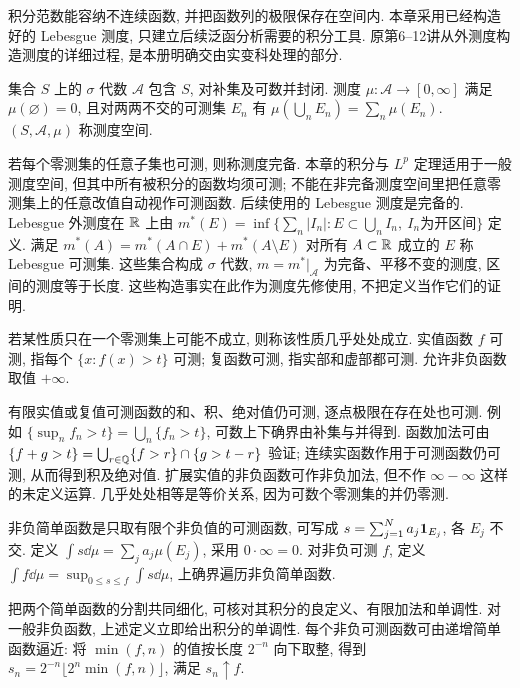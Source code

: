 \label{ch:measure}
积分范数能容纳不连续函数, 并把函数列的极限保存在空间内. 本章采用已经构造好的 Lebesgue 测度, 只建立后续泛函分析需要的积分工具. 原第6--12讲从外测度构造测度的详细过程, 是本册明确交由实变科处理的部分.

\begin{definition}
集合 $S$ 上的 $\sigma$ 代数 $\mathcal A$ 包含 $S$, 对补集及可数并封闭. 测度 $\mu:\mathcal A\to[0,\infty]$ 满足 $\mu(\varnothing)=0$, 且对两两不交的可测集 $E_n$ 有 $\mu(\bigcup_nE_n)=\sum_n\mu(E_n)$. $(S,\mathcal A,\mu)$ 称测度空间.
\end{definition}
若每个零测集的任意子集也可测, 则称测度完备. 本章的积分与 $L^p$ 定理适用于一般测度空间, 但其中所有被积分的函数均须可测; 不能在非完备测度空间里把任意零测集上的任意改值自动视作可测函数. 后续使用的 Lebesgue 测度是完备的.
Lebesgue 外测度在 $\mathbb R$ 上由
$m^*(E)=\inf\{\sum_n|I_n|:E\subset\bigcup_n I_n,\ I_n\text{为开区间}\}$ 定义. 满足 $m^*(A)=m^*(A\cap E)+m^*(A\setminus E)$ 对所有 $A\subset\mathbb R$ 成立的 $E$ 称 Lebesgue 可测集. 这些集合构成 $\sigma$ 代数, $m=m^*|_{\mathcal A}$ 为完备、平移不变的测度, 区间的测度等于长度. 这些构造事实在此作为测度先修使用, 不把定义当作它们的证明.

\begin{definition}
若某性质只在一个零测集上可能不成立, 则称该性质几乎处处成立. 实值函数 $f$ 可测, 指每个 $\{x:f(x)>t\}$ 可测; 复函数可测, 指实部和虚部都可测. 允许非负函数取值 $+\infty$.
\end{definition}
有限实值或复值可测函数的和、积、绝对值仍可测, 逐点极限在存在处也可测. 例如 $\{\sup_nf_n>t\}=\bigcup_n\{f_n>t\}$, 可数上下确界由补集与并得到. 函数加法可由 $\{f+g>t\}=\bigcup_{r\in\mathbb Q}\{f>r\}\cap\{g>t-r\}$ 验证; 连续实函数作用于可测函数仍可测, 从而得到积及绝对值. 扩展实值的非负函数可作非负加法, 但不作 $\infty-\infty$ 这样的未定义运算. 几乎处处相等是等价关系, 因为可数个零测集的并仍零测.

\begin{definition}
非负简单函数是只取有限个非负值的可测函数, 可写成 $s=\sum_{j=1}^Na_j\mathbf 1_{E_j}$, 各 $E_j$ 不交. 定义 $\int s\dd\mu=\sum_ja_j\mu(E_j)$, 采用 $0\cdot\infty=0$. 对非负可测 $f$, 定义 $\int f\dd\mu=\sup_{0\le s\le f}\int s\dd\mu$, 上确界遍历非负简单函数.
\end{definition}
把两个简单函数的分割共同细化, 可核对其积分的良定义、有限加法和单调性. 对一般非负函数, 上述定义立即给出积分的单调性. 每个非负可测函数可由递增简单函数逼近: 将 $\min(f,n)$ 的值按长度 $2^{-n}$ 向下取整, 得到 $s_n=2^{-n}\lfloor2^n\min(f,n)\rfloor$, 满足 $s_n\uparrow f$.


